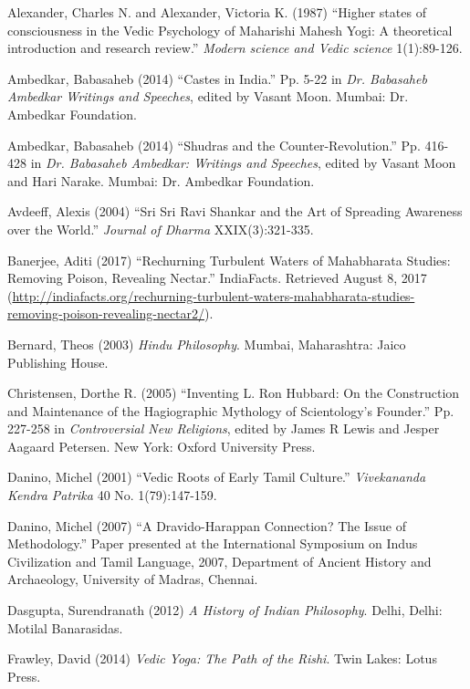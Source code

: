 \begin{thebibliography}{99}
 Alexander, Charles N. and Alexander, Victoria K. (1987) “Higher states of consciousness in the Vedic Psychology of Maharishi Mahesh Yogi: A theoretical introduction and research review.” \textit{Modern science and Vedic science} 1(1):89-126.

  Ambedkar, Babasaheb (2014) “Castes in India.” Pp. 5-22 in \textit{Dr. Babasaheb Ambedkar Writings and Speeches}, edited by Vasant Moon. Mumbai: Dr. Ambedkar Foundation.

  Ambedkar, Babasaheb (2014) “Shudras and the Counter-Revolution.” Pp. 416-428 in \textit{Dr. Babasaheb Ambedkar: Writings and Speeches}, edited by Vasant Moon and Hari Narake. Mumbai: Dr. Ambedkar Foundation.

  Avdeeff, Alexis (2004) “Sri Sri Ravi Shankar and the Art of Spreading Awareness over the World.” \textit{Journal of Dharma} XXIX(3):321-335.

  Banerjee, Aditi (2017) “Rechurning Turbulent Waters of Mahabharata Studies: Removing Poison, Revealing Nectar.” IndiaFacts. Retrieved August 8, 2017 (\url{http://indiafacts.org/rechurning-turbulent-waters-mahabharata-studies-removing-poison-revealing-nectar2/}).

  Bernard, Theos (2003) \textit{Hindu Philosophy}. Mumbai, Maharashtra: Jaico Publishing House.

  Christensen, Dorthe R. (2005) “Inventing L. Ron Hubbard: On the Construction and Maintenance of the Hagiographic Mythology of Scientology's Founder.” Pp. 227-258 in \textit{Controversial New Religions}, edited by James R Lewis and Jesper Aagaard Petersen. New York: Oxford University Press.

  Danino, Michel (2001) “Vedic Roots of Early Tamil Culture.” \textit{Vivekananda Kendra Patrika} 40 No. 1(79):147-159.

  Danino, Michel (2007) “A Dravido-Harappan Connection? The Issue of Methodology.” Paper presented at the International Symposium on Indus Civilization and Tamil Language, 2007, Department of Ancient History and Archaeology, University of Madras, Chennai.

  Dasgupta, Surendranath (2012) \textit{A History of Indian Philosophy}. Delhi, Delhi: Motilal Banarasidas.

  Frawley, David (2014) \textit{Vedic Yoga: The Path of the Rishi}. Twin Lakes: Lotus Press.


\end{thebibliography}
